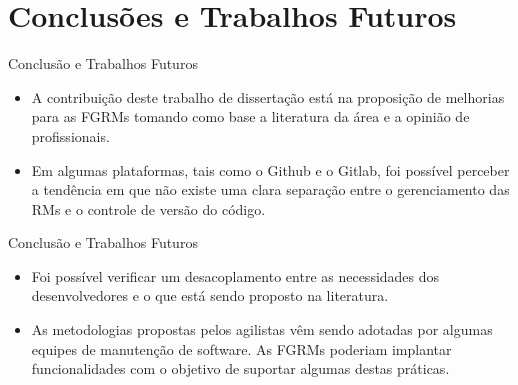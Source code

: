 \documentclass[t,14pt,mathserif]{beamer}
\begin{document}
\section{Conclusões e Trabalhos Futuros}

\begin{frame}{Conclusão e Trabalhos Futuros}
    \begin{itemize}
        \item A contribuição deste trabalho de dissertação está na proposição de
            melhorias para as FGRMs tomando como base a literatura da área e a
            opinião de profissionais.

        \item Em algumas plataformas, tais como o Github e o Gitlab, foi
              possível perceber a tendência em que não existe uma clara separação
              entre o gerenciamento das RMs e o controle de versão do código.

    \end{itemize}
\end{frame}

\begin{frame}{Conclusão e Trabalhos Futuros}
    \begin{itemize}

        \item Foi possível verificar um desacoplamento entre as necessidades
            dos desenvolvedores e o que está sendo proposto na literatura.

        \item  As metodologias propostas pelos agilistas vêm sendo adotadas por
            algumas equipes de manutenção de software. As FGRMs poderiam
            implantar funcionalidades com o objetivo de suportar algumas destas
            práticas.

    \end{itemize}
\end{frame}
\end{document}
